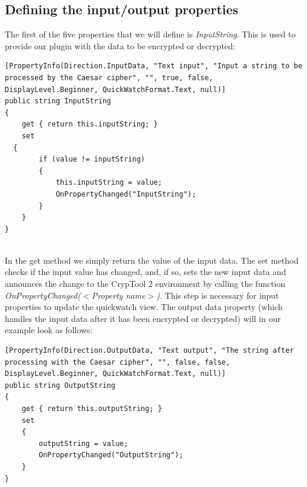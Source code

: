 \subsection{Defining the input/output properties}
\label{sec:DefiningTheInputOutputProperties}

The first of the five properties that we will define is \textit{InputString}. This is used to provide our plugin with the data to be encrypted or decrypted:

\begin{lstlisting}
[PropertyInfo(Direction.InputData, "Text input", "Input a string to be processed by the Caesar cipher", "", true, false, DisplayLevel.Beginner, QuickWatchFormat.Text, null)]
public string InputString
{
	get { return this.inputString; }
	set
  {
		if (value != inputString)
		{
			this.inputString = value;
			OnPropertyChanged("InputString");
		}
	}
}
\end{lstlisting}

\ \\
In the get method we simply return the value of the input data. The set method checks if the input value has changed, and, if so, sets the new input data and announces the change to the CrypTool 2 environment by calling the function \textit{OnPropertyChanged(\textit{$<$Property name$>$})}. This step is necessary for input properties to update the quickwatch view. The output data property (which handles the input data after it has been encrypted or decrypted) will in our example look as follows:


\begin{lstlisting}
[PropertyInfo(Direction.OutputData, "Text output", "The string after processing with the Caesar cipher", "", false, false, DisplayLevel.Beginner, QuickWatchFormat.Text, null)]
public string OutputString
{
	get { return this.outputString; }
	set
	{
		outputString = value;
		OnPropertyChanged("OutputString");
	}
}
\end{lstlisting}

